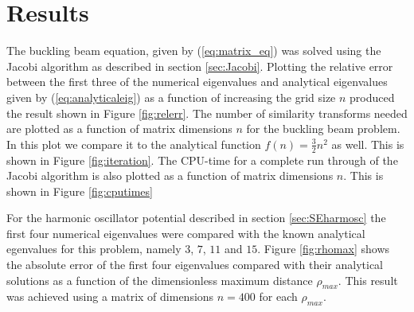 \documentclass[twocolumn]{aastex62}
\begin{document}
\section{Results} \label{sec:results}
The buckling beam equation, given by (\ref{eq:matrix_eq}) was solved using the Jacobi algorithm as described in section \ref{sec:Jacobi}. Plotting the relative error between the first three of the numerical eigenvalues and analytical eigenvalues given by (\ref{eq:analyticaleig}) as a function of increasing the grid size $n$ produced the result shown in Figure \ref{fig:relerr}. The number of similarity transforms needed are plotted as a function of matrix dimensions $n$ for the buckling beam problem. In this plot we compare it to the analytical function $f(n)=\frac{3}{2}n^2$ as well. This is shown in Figure \ref{fig:iteration}. The CPU-time for a complete run through of the Jacobi algorithm is also plotted as a function of matrix dimensions $n$.  This is shown in Figure \ref{fig:cputimes}\\\indent
\begin{figure*}[h]
	\caption{Figure showing the relative error between the numerical and analytical eigenvalues, given by equation \ref{eq:analyticaleig}, as a function of $n$ for the buckling beam problem given by (\ref{eq:matrix_eq}). Here $n$ starts at $n=3$. }
	\label{fig:relerr}
\end{figure*}
\begin{figure*}[h]
	\caption{Figure showing the number of similarity transforms conducted before the off-diagonal elements are set below a tolerance when solving the buckling beam problem using the Jacobi algorithm.}
	\label{fig:iteration}
\end{figure*}
\begin{figure*}[h]
	\caption{Figure showing the CPU-time as a function of matrix dimension $n$ when solving the buckling beam problem with the jacobi algorithm. The data is compared with the analytical function $f(n)=\frac{3}{2}n^2$.}
	\label{fig:cputimes}
\end{figure*}
For the harmonic oscillator potential described in section \ref{sec:SEharmosc} the first four numerical eigenvalues were compared with the known analytical egenvalues for this problem, namely $3$, $7$, $11$ and $15$. Figure \ref{fig:rhomax} shows the absolute error of the first four eigenvalues compared with their analytical solutions as a function of the dimensionless maximum distance $\rho_{max}$. This result was achieved using a matrix of dimensions $n=400$ for each $\rho_{max}$.\\\indent
\end{document}
